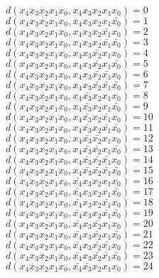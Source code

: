 \documentclass{basic}
\begin{document}
\(d(x_4 x_3 x_2 x_1 x_0, x_4 x_3 x_2 x_1 x_0) = 0\)\\
\(d(x_4 x_3 x_2 x_1 x_0, x_4 x_3 x_2 x_1 \bar{x_0}) = 1\)\\
\(d(x_4 x_3 x_2 x_1 x_0, x_4 x_3 x_2 \bar{x_1} x_0) = 2\)\\
\(d(x_4 x_3 x_2 x_1 x_0, x_4 x_3 x_2 \bar{x_1} \bar{x_0}) = 3\)\\
\(d(x_4 x_3 x_2 x_1 x_0, x_4 x_3 \bar{x_2} x_1 x_0) = 4\)\\
\(d(x_4 x_3 x_2 x_1 x_0, x_4 x_3 \bar{x_2} x_1 \bar{x_0}) = 5\)\\
\(d(x_4 x_3 x_2 x_1 x_0, x_4 x_3 \bar{x_2} \bar{x_1} x_0) = 6\)\\
\(d(x_4 x_3 x_2 x_1 x_0, x_4 x_3 \bar{x_2} \bar{x_1} \bar{x_0}) = 7\)\\
\(d(x_4 x_3 x_2 x_1 x_0, x_4 \bar{x_3} x_2 x_1 x_0) = 8\)\\
\(d(x_4 x_3 x_2 x_1 x_0, x_4 \bar{x_3} x_2 x_1 \bar{x_0}) = 9\)\\
\(d(x_4 x_3 x_2 x_1 x_0, x_4 \bar{x_3} x_2 \bar{x_1} x_0) = 10\)\\
\(d(x_4 x_3 x_2 x_1 x_0, x_4 \bar{x_3} x_2 \bar{x_1} \bar{x_0}) = 11\)\\
\(d(x_4 x_3 x_2 x_1 x_0, x_4 \bar{x_3} \bar{x_2} x_1 x_0) = 12\)\\
\(d(x_4 x_3 x_2 x_1 x_0, x_4 \bar{x_3} \bar{x_2} x_1 \bar{x_0}) = 13\)\\
\(d(x_4 x_3 x_2 x_1 x_0, x_4 \bar{x_3} \bar{x_2} \bar{x_1} x_0) = 14\)\\
\(d(x_4 x_3 x_2 x_1 x_0, x_4 \bar{x_3} \bar{x_2} \bar{x_1} \bar{x_0}) = 15\)\\
\(d(x_4 x_3 x_2 x_1 x_0, \bar{x_4} x_3 x_2 x_1 x_0) = 16\)\\
\(d(x_4 x_3 x_2 x_1 x_0, \bar{x_4} x_3 x_2 x_1 \bar{x_0}) = 17\)\\
\(d(x_4 x_3 x_2 x_1 x_0, \bar{x_4} x_3 x_2 \bar{x_1} x_0) = 18\)\\
\(d(x_4 x_3 x_2 x_1 x_0, \bar{x_4} x_3 x_2 \bar{x_1} \bar{x_0}) = 19\)\\
\(d(x_4 x_3 x_2 x_1 x_0, \bar{x_4} x_3 \bar{x_2} x_1 x_0) = 20\)\\
\(d(x_4 x_3 x_2 x_1 x_0, \bar{x_4} x_3 \bar{x_2} x_1 \bar{x_0}) = 21\)\\
\(d(x_4 x_3 x_2 x_1 x_0, \bar{x_4} x_3 \bar{x_2} \bar{x_1} x_0) = 22\)\\
\(d(x_4 x_3 x_2 x_1 x_0, \bar{x_4} x_3 \bar{x_2} \bar{x_1} \bar{x_0}) = 23\)\\
\(d(x_4 x_3 x_2 x_1 x_0, \bar{x_4} \bar{x_3} x_2 x_1 x_0) = 24\)\\
\end{document}
